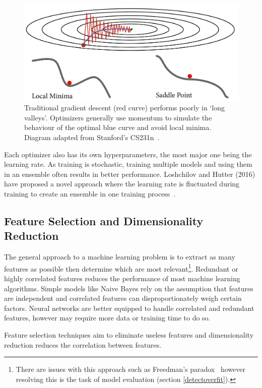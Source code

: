 \documentclass[12pt, twoside]{book}
\begin{document}
\begin{figure}[h]
	\label{cnnvis}
	\centering\includegraphics[width=0.82\linewidth]{gradescent.png}
	\caption{Traditional gradient descent (red curve) performs poorly in `long valleys'. Optimizers generally use momentum to simulate the behaviour of the optimal blue curve and avoid local minima. Diagram adapted from Stanford's CS231n~\cite{cs231n}.}
\end{figure}

Each optimizer also has its own hyperparameters, the most major one being the learning rate. As training is stochastic, training multiple models and using them in an ensemble often results in better performance. Loshchilov and Hutter (2016) have proposed a novel approach where the learning rate is fluctuated during training to create an ensemble in one training process~\cite{sgdrestarts}. 


\subsection{Feature Selection and Dimensionality Reduction}
The general approach to a machine learning problem is to extract as many features as possible then determine which are most relevant\footnote{There are issues with this approach such as Freedman's paradox~\cite{freedmanparadox} however resolving this is the task of model evaluation (section \ref{detectoverfit}).}. Redundant or highly correlated features reduces the performance of most machine learning algorithms. Simple models like Naive Bayes rely on the assumption that features are independent and correlated features can disproportionately weigh certain factors. Neural networks are better equipped to handle correlated and redundant features, however may require more data or training time to do so. 


\begin{highlight}
	Feature selection techniques aim to eliminate useless features and dimensionality reduction reduces the correlation between features.
\end{highlight} 
\end{document}
